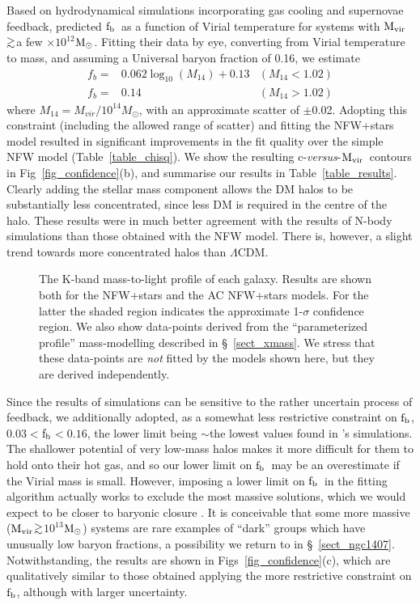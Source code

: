 \documentclass{emulateapj}
\def\spose#1{\hbox to 0pt{#1\hss}}
\def\gtsim{$\mathrel{\spose{\lower 3pt\hbox{$\sim$}} 
        \raise 2.0pt\hbox{$>$}}$\thinspace}
\def \msun {${\rm M_\odot}$}
\newcommand{\mvir}{${\rm M_{vir}}$}
\newcommand{\lcdm}{$\Lambda$CDM}
\newcommand{\fbaryons}{${\rm f_{b}}$}
\begin{document}
Based on hydrodynamical simulations incorporating gas cooling and 
supernovae feedback, \citet{kay03a} predicted \fbaryons\ as a function
of Virial temperature for systems with \mvir\gtsim a few $\times 10^{12}$\msun.
Fitting their data by eye, converting from Virial temperature to mass,
and assuming a Universal baryon fraction of 0.16, we estimate
\begin{eqnarray}
f_{b} = & 0.062 \log_{10}(M_{14})+0.13 & (M_{14}<1.02) \label{eqn_baryons} \\
f_{b} = & 0.14                         & (M_{14}>1.02)\nonumber 
\end{eqnarray}
where ${M_{14}=M_{vir}/10^{14} M_\odot}$, with an approximate scatter of 
$\pm$0.02. 
Adopting this constraint (including the allowed range of scatter)
and fitting the NFW+stars model resulted
in significant improvements in the fit quality over the simple NFW 
model (Table~\ref{table_chisq}).
We show  the resulting c-{\em versus}-\mvir\ contours in 
Fig~\ref{fig_confidence}(b), and 
summarise our results in Table~\ref{table_results}. 
Clearly adding the stellar mass component
allows the DM halos to be substantially less concentrated, since
less DM is required in the centre of the halo.
These results were  in much better agreement with the results
of N-body simulations than those obtained with the NFW model. 
There is, however, a slight trend towards 
more concentrated halos than \lcdm. 
\begin{figure}
\centering
\caption{The K-band mass-to-light profile of each galaxy. Results are shown
both for the NFW+stars and the AC NFW+stars models. For the latter the shaded 
region indicates the approximate 1-$\sigma$ confidence region.
We also show data-points derived from the ``parameterized profile''
mass-modelling described in \S~\ref{sect_xmass}. We stress that these
data-points are {\em not} fitted by the models shown here, but they
are derived independently.}
\label{fig_mass_to_light}
\end{figure}

Since the results of simulations can be sensitive to the rather uncertain
process of feedback, we additionally adopted, as a 
somewhat less restrictive constraint on \fbaryons, 0.03$<$\fbaryons$<0.16$,
the lower limit being $\sim$the lowest values found in
\citeauthor{kay03a}'s simulations. 
The shallower potential of very low-mass halos
makes it more difficult for them to hold onto their hot gas,
and so our lower limit on \fbaryons\ may be an overestimate if 
the Virial mass is small. However, imposing a lower limit on
\fbaryons\ in the fitting algorithm actually works to exclude
the most massive solutions, which we would expect to be closer 
to baryonic closure \citep{mathews05a}. It is conceivable that some 
more massive (\mvir\gtsim $10^{13}$\msun) systems are rare examples 
of ``dark'' groups which have unusually low baryon fractions,
a possibility we return to in \S~\ref{sect_ngc1407}.
Notwithstanding, the results are shown in Figs~\ref{fig_confidence}(c), 
which are qualitatively similar to those obtained applying the more 
restrictive constraint on \fbaryons, although with larger 
uncertainty.
\end{document}
